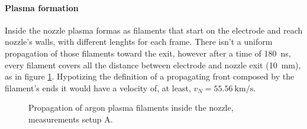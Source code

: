 \paragraph{Plasma formation}
Inside the nozzle plasma formas as filaments that start on the electrode and reach nozzle's walls, with different lenghts for each frame. There isn't a uniform propagation of those filaments toward the exit, however after a time of \SI{180}{\nano\second}, every filament covers all the distance between electrode and nozzle exit (\SI{10}{\milli\meter}), as in figure \ref{fig:arnoz_prop}. Hypotizing the definition of a propagating front composed by the filament's ends it would have a velocity of, at least, $v_{N} = \SI{55.56}{\kilo\meter/\second}$. 
\begin{figure}
 \centering
 
 
 \caption{Propagation of argon plasma filaments inside the nozzle, measurements setup A.}
 \label{fig:arnoz_prop}
\end{figure}

